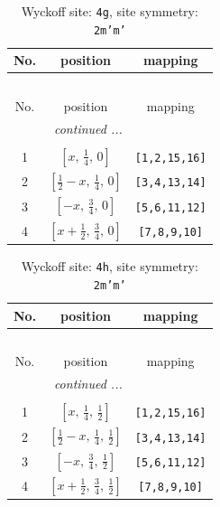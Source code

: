 \documentclass[fleqn,8pt]{jsarticle}
\begin{document}
\renewcommand{\arraystretch}{1.2}
\begin{longtable}{ccc}
\caption{Wyckoff site: {\tt 4g}, site symmetry: {\tt 2m'm'}}
 \\
 \hline \hline
No. & position & mapping \\ \hline \endfirsthead

\multicolumn{2}{l}{\tablename\ \thetable{}} \\
 \hline \hline
No. & position & mapping \\ \hline \endhead

 \hline \hline
\multicolumn{2}{r}{\footnotesize\it continued ...} \\ \endfoot

 \hline \hline
\multicolumn{2}{r}{} \\ \endlastfoot

1 & $\left[ x,\, \frac{1}{4},\, 0 \right]$ & {\tt [1,2,15,16]} \\ \hline
2 & $\left[ \frac{1}{2} - x,\, \frac{1}{4},\, 0 \right]$ & {\tt [3,4,13,14]} \\ \hline
3 & $\left[ - x,\, \frac{3}{4},\, 0 \right]$ & {\tt [5,6,11,12]} \\ \hline
4 & $\left[ x + \frac{1}{2},\, \frac{3}{4},\, 0 \right]$ & {\tt [7,8,9,10]} \\
\end{longtable}
\renewcommand{\arraystretch}{1.2}
\begin{longtable}{ccc}
\caption{Wyckoff site: {\tt 4h}, site symmetry: {\tt 2m'm'}}
 \\
 \hline \hline
No. & position & mapping \\ \hline \endfirsthead

\multicolumn{2}{l}{\tablename\ \thetable{}} \\
 \hline \hline
No. & position & mapping \\ \hline \endhead

 \hline \hline
\multicolumn{2}{r}{\footnotesize\it continued ...} \\ \endfoot

 \hline \hline
\multicolumn{2}{r}{} \\ \endlastfoot

1 & $\left[ x,\, \frac{1}{4},\, \frac{1}{2} \right]$ & {\tt [1,2,15,16]} \\ \hline
2 & $\left[ \frac{1}{2} - x,\, \frac{1}{4},\, \frac{1}{2} \right]$ & {\tt [3,4,13,14]} \\ \hline
3 & $\left[ - x,\, \frac{3}{4},\, \frac{1}{2} \right]$ & {\tt [5,6,11,12]} \\ \hline
4 & $\left[ x + \frac{1}{2},\, \frac{3}{4},\, \frac{1}{2} \right]$ & {\tt [7,8,9,10]} \\
\end{longtable}
\end{document}

